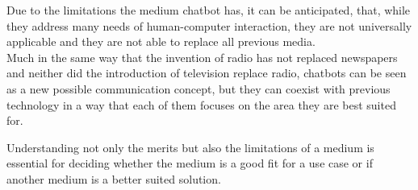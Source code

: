 Due to the limitations the medium chatbot has, it can be anticipated,
that, while they address many needs of human-computer interaction,
they are not universally applicable and they are not able to replace all previous media.
\\

Much in the same way that the invention of radio has not replaced newspapers
and neither did the introduction of television replace radio,
chatbots can be seen as a new possible communication concept,
but they can coexist with previous technology in a way that each of them focuses on the area they are best suited for.

Understanding not only the merits but also the limitations of a medium is essential for deciding
whether the medium is a good fit for a use case or if another medium is a better suited solution.
\\
